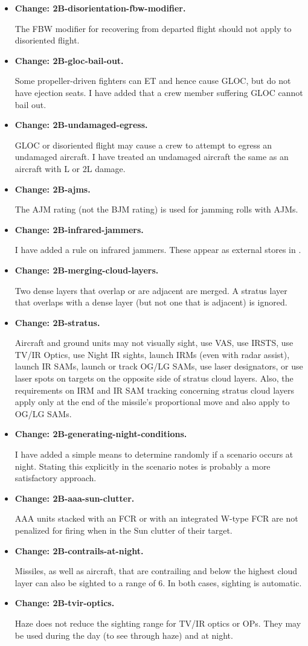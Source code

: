 \documentclass[10pt]{report}
\newcommand{\itemtag}[1]{\item \textbf{Change: #1.}\par}
\begin{document}
\begin{itemize}
    \itemtag{2B-disorientation-fbw-modifier} The FBW modifier for recovering from departed flight should not apply to disoriented flight.

    \itemtag{2B-gloc-bail-out} Some propeller-driven fighters can ET and hence cause GLOC, but do not have ejection seats. I have added that a crew member suffering GLOC cannot bail out.

    \itemtag{2B-undamaged-egress} GLOC or disoriented flight may cause a crew to attempt to egress an undamaged aircraft. I have treated an undamaged aircraft the same as an aircraft with L or 2L damage.
    
    \itemtag{2B-ajms} The AJM rating (not the BJM rating) is used for jamming rolls with AJMs.
    
    \itemtag{2B-infrared-jammers} I have added a rule on infrared jammers. These appear as external stores in {\TSOH}.
    
    \itemtag{2B-merging-cloud-layers} Two dense layers that overlap or are adjacent are merged. A stratus layer that overlaps with a dense layer (but not one that is adjacent) is ignored.
    
    \itemtag{2B-stratus} Aircraft and ground units may not visually sight, use VAS, use IRSTS, use TV/IR Optics, use Night IR sights, launch IRMs (even with radar assist), launch IR SAMs, launch or track OG/LG SAMs, use laser designators, or use laser spots on targets on the opposite side of stratus cloud layers. Also, the requirements on IRM and IR SAM tracking concerning stratus cloud layers apply only at the end of the missile’s proportional move and also apply to OG/LG SAMs.
    
    \itemtag{2B-generating-night-conditions} I have added a simple means to determine randomly if a scenario occurs at night. Stating this explicitly in the scenario notes is probably a more satisfactory approach.
    
    \itemtag{2B-aaa-sun-clutter} AAA units stacked with an FCR or with an integrated W-type FCR are not penalized for firing when in the Sun clutter of their target.
    
    \itemtag{2B-contrails-at-night} Missiles, as well as aircraft, that are contrailing and below the highest cloud layer can also be sighted to a range of 6. In both cases, sighting is automatic.
    
    \itemtag{2B-tvir-optics} Haze does not reduce the sighting range for TV/IR optics or OPs. They may be used during the day (to see through haze) and at night.
    

\end{itemize}
\end{document}
